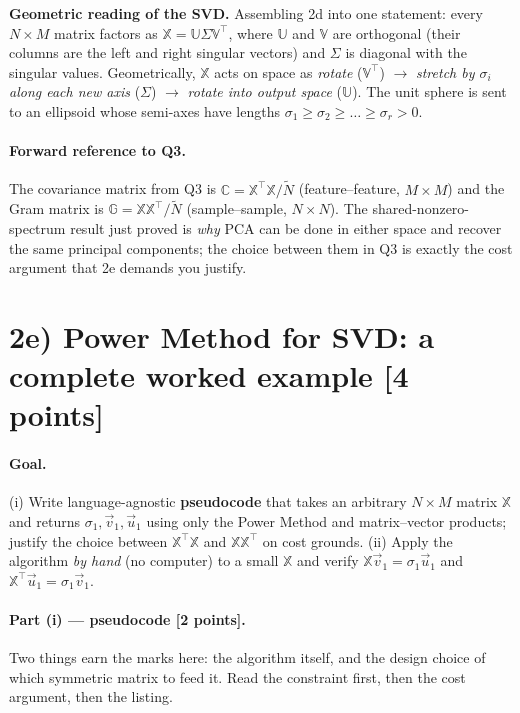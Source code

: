 \documentclass[12pt,a4paper]{article}
\begin{document}
\begin{insight}
\textbf{Geometric reading of the SVD.} Assembling 2d into one statement: every $N\times M$ matrix factors as $\mathbb{X} = \mathbb{U}\Sigma\mathbb{V}^\top$, where $\mathbb{U}$ and $\mathbb{V}$ are orthogonal (their columns are the left and right singular vectors) and $\Sigma$ is diagonal with the singular values. Geometrically, $\mathbb{X}$ acts on space as \emph{rotate} ($\mathbb{V}^\top$) $\to$ \emph{stretch by $\sigma_i$ along each new axis} ($\Sigma$) $\to$ \emph{rotate into output space} ($\mathbb{U}$). The unit sphere is sent to an ellipsoid whose semi-axes have lengths $\sigma_1\ge\sigma_2\ge\dots\ge\sigma_r > 0$.
\end{insight}

\paragraph{Forward reference to Q3.} The covariance matrix from Q3 is $\mathbb{C} = \mathbb{X}^\top\mathbb{X}/\tilde N$ (feature--feature, $M\times M$) and the Gram matrix is $\mathbb{G} = \mathbb{X}\mathbb{X}^\top/\tilde N$ (sample--sample, $N\times N$). The shared-nonzero-spectrum result just proved is \emph{why} PCA can be done in either space and recover the same principal components; the choice between them in Q3 is exactly the cost argument that 2e demands you justify.

\section*{2e) Power Method for SVD: a complete worked example [4 points]}

\paragraph{Goal.} (i) Write language-agnostic \textbf{pseudocode} that takes an arbitrary $N\times M$ matrix $\mathbb{X}$ and returns $\sigma_1, \vec v_1, \vec u_1$ using only the Power Method and matrix--vector products; justify the choice between $\mathbb{X}^\top\mathbb{X}$ and $\mathbb{X}\mathbb{X}^\top$ on cost grounds. (ii) Apply the algorithm \emph{by hand} (no computer) to a small $\mathbb{X}$ and verify $\mathbb{X}\vec v_1 = \sigma_1\vec u_1$ and $\mathbb{X}^\top\vec u_1 = \sigma_1\vec v_1$.

\paragraph{Part (i) --- pseudocode [2 points].} Two things earn the marks here: the algorithm itself, and the design choice of which symmetric matrix to feed it. Read the constraint first, then the cost argument, then the listing.
\end{document}
